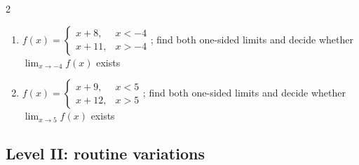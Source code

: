 \documentclass[11pt,oneside]{book}
\begin{document}
\begin{multicols}{2}
\begin{enumerate}[leftmargin=*,label=\textbf{\arabic*.},itemsep=0.65\baselineskip]
\item $f(x)=\begin{cases} x + 8, & x<-4\\ x + 11, & x>-4 \end{cases}$; find both one-sided limits and decide whether $\lim_{x\to -4}f(x)$ exists
\item $f(x)=\begin{cases} x + 9, & x<5\\ x + 12, & x>5 \end{cases}$; find both one-sided limits and decide whether $\lim_{x\to 5}f(x)$ exists
\end{enumerate}
\end{multicols}
\subsection*{Level II: routine variations}
\end{document}
